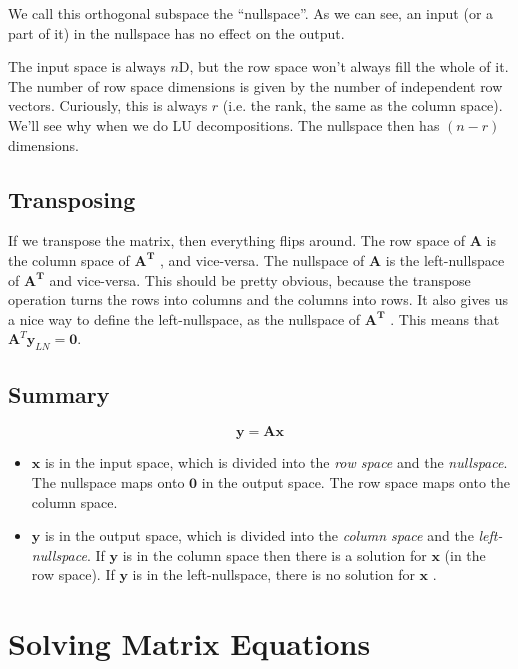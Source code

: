 \documentclass[a4paper,10pt]{article}
\newcommand{\mA}{$\mathbf{A}$ }
\newcommand{\mAT}{$\mathbf{A^T}$ }
\newcommand{\vx}{$\mathbf{x}$ }
\newcommand{\vy}{$\mathbf{y}$ }
\begin{document}
We call this orthogonal subspace the ``nullspace''. As we can see, an input (or a part of it) in the nullspace has no effect on the output.

The input space is always $n$D, but the row space won't always fill the whole of it. The number of row space dimensions is given by the number of independent row vectors. Curiously, this is always $r$ (i.e. the rank, the same as the column space). We'll see why when we do LU decompositions. The nullspace then has $(n-r)$ dimensions.



\subsection{Transposing}

If we transpose the matrix, then everything flips around. The row space of \mA is the column space of \mAT, and vice-versa. The nullspace of \mA is the left-nullspace of \mAT and vice-versa. This should be pretty obvious, because the transpose operation turns the rows into columns and the columns into rows. It also gives us a nice way to define the left-nullspace, as the nullspace of \mAT. This means that $\mathbf{A}^T \mathbf{y}_{LN} = \mathbf{0}$.



\subsection{Summary}

\begin{equation}
 \mathbf{y} = \mathbf{A x}
\end{equation}

\begin{itemize}
\item \vx is in the input space, which is divided into the \emph{row space} and the \emph{nullspace}. The nullspace maps onto $\mathbf{0}$ in the output space. The row space maps onto the column space.

\item \vy is in the output space, which is divided into the \emph{column space} and the \emph{left-nullspace}. If \vy is in the column space then there is a solution for \vx (in the row space). If \vy is in the left-nullspace, there is no solution for \vx.

\end{itemize}


\section{Solving Matrix Equations}
\end{document}
